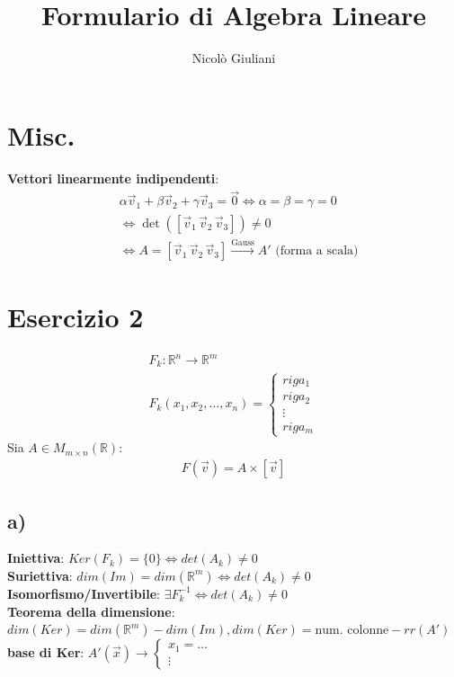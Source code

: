 \documentclass[a4paper,12pt]{article}
\title{Formulario di Algebra Lineare}
\author{Nicolò Giuliani}
\date{}
\begin{document}
\section*{Misc.}
\textbf{Vettori linearmente indipendenti}:
\begin{align*}
    &\alpha \vec{v}_1 + \beta \vec{v}_2 + \gamma \vec{v}_3 = \vec{0} \iff \alpha = \beta = \gamma = 0 \\
    &\iff \det([\vec{v}_1 \, \vec{v}_2 \, \vec{v}_3]) \neq 0  \\
    &\iff A = [\vec{v}_1 \, \vec{v}_2 \, \vec{v}_3] \xrightarrow{\text{Gauss}} A' \text{ (forma a scala)}
\end{align*}

\section*{Esercizio 2}
\begin{align*}
    F_k : \mathbb{R}^n \to \mathbb{R}^m\\
    F_k(x_1,x_2,\dots,x_n)=\begin{cases} 
        riga_1 \\
        riga_2 \\
        \vdots \\
        riga_m
    \end{cases}
\end{align*}
Sia $A \in M_{m\times n} (\mathbb{R})$: \\
\begin{align*}
    F(\vec{v})=A\times [\vec{v}]
\end{align*}
\subsection*{a)}
\textbf{Iniettiva}: $Ker(F_k)=\{0\} \iff det(A_k)\neq 0 $ \\
\textbf{Suriettiva}: $dim(Im)=dim(\mathbb{R}^{m})\iff det(A_k)\neq 0$ \\
\textbf{Isomorfismo/Invertibile}: $\exists F^{-1}_k \iff det(A_k)\neq0$ \\
\textbf{Teorema della dimensione}: $dim(Ker)=dim(\mathbb{R}^m)-dim(Im), dim(Ker)=\text{num. colonne} -rr(A')$ \\
\textbf{base di Ker}: $A'(\vec{x}) \to \begin{cases}
    x_1= \dots \\
    \vdots
\end{cases}$
\end{document}
